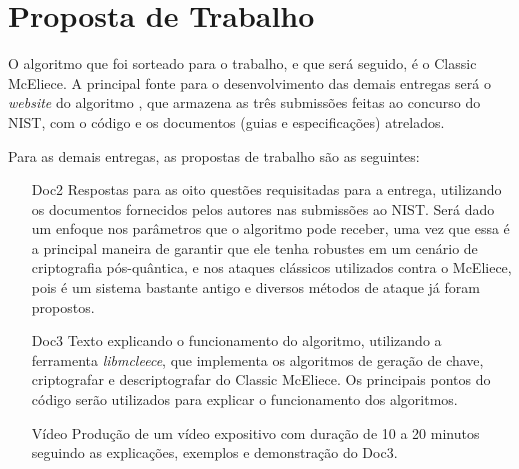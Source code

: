 \section*{Proposta de Trabalho}

O algoritmo que foi sorteado para o trabalho, e que será seguido, é o Classic McEliece. A principal fonte para o desenvolvimento das demais entregas será o \emph{website} do algoritmo \cite{ClassicMcEliece}, que armazena as três submissões feitas ao concurso do NIST, com o código e os documentos (guias e especificações) atrelados.

Para as demais entregas, as propostas de trabalho são as seguintes:

\begin{itemize}
    \item[Doc2] Respostas para as oito questões requisitadas para a entrega, utilizando os documentos fornecidos pelos autores nas submissões ao NIST. Será dado um enfoque nos parâmetros que o algoritmo pode receber, uma vez que essa é a principal maneira de garantir que ele tenha robustes em um cenário de criptografia pós-quântica, e nos ataques clássicos utilizados contra o McEliece, pois é um sistema bastante antigo e diversos métodos de ataque já foram propostos.
    
    \item[Doc3] Texto explicando o funcionamento do algoritmo, utilizando a ferramenta \textit{libmcleece}, que implementa os algoritmos de geração de chave, criptografar e descriptografar do Classic McEliece. Os principais pontos do código serão utilizados para explicar o funcionamento dos algoritmos.
    
    \item[Vídeo] Produção de um vídeo expositivo com duração de 10 a 20 minutos seguindo as explicações, exemplos e demonstração do Doc3.
\end{itemize}